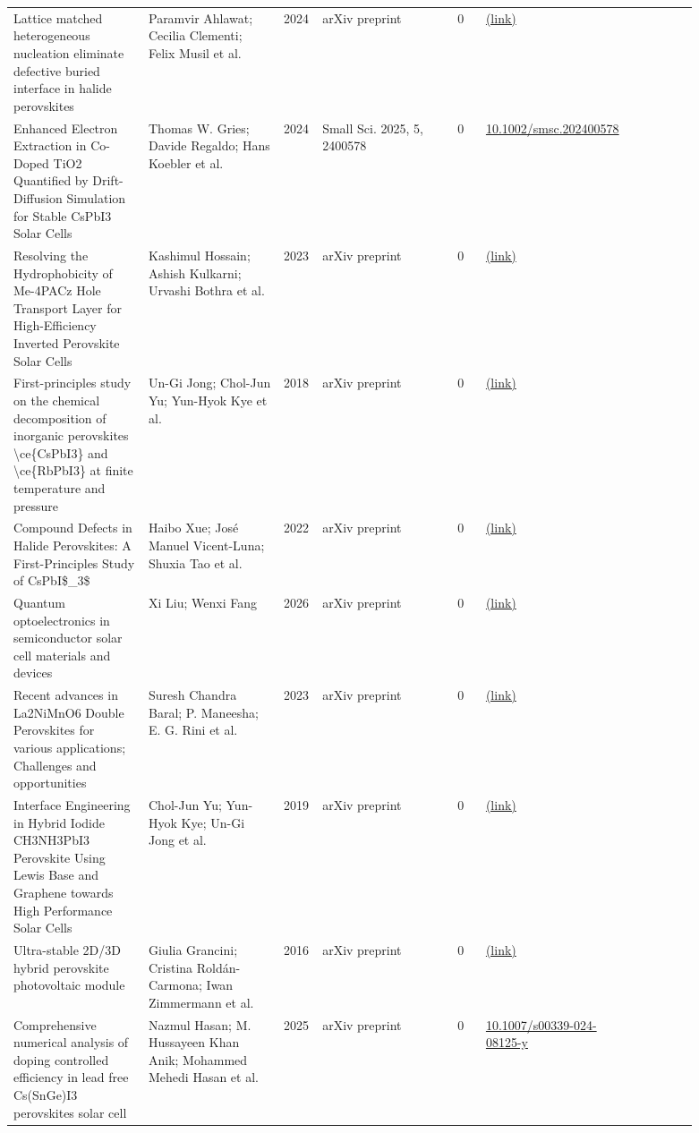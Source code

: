 \documentclass[10pt,a4paper]{article}
\begin{document}
{\begin{longtable}{p{0.197\linewidth}p{0.197\linewidth}p{0.043\linewidth}p{0.197\linewidth}p{0.043\linewidth}p{0.117\linewidth}p{0.098\linewidth}}
Lattice matched heterogeneous nucleation eliminate defective buried interface in halide perovskites & Paramvir Ahlawat; Cecilia Clementi; Felix Musil et al. & 2024 & arXiv preprint & 0 & \href{http://arxiv.org/abs/2405.11599v1}{(link)} &  \\
Enhanced Electron Extraction in Co-Doped TiO2 Quantified by Drift-Diffusion Simulation for Stable CsPbI3 Solar Cells & Thomas W. Gries; Davide Regaldo; Hans Koebler et al. & 2024 & Small Sci. 2025, 5, 2400578 & 0 & \href{https://doi.org/10.1002/smsc.202400578}{10.1002/smsc.202400578} &  \\
Resolving the Hydrophobicity of Me-4PACz Hole Transport Layer for High-Efficiency Inverted Perovskite Solar Cells & Kashimul Hossain; Ashish Kulkarni; Urvashi Bothra et al. & 2023 & arXiv preprint & 0 & \href{http://arxiv.org/abs/2304.13788v1}{(link)} &  \\
First-principles study on the chemical decomposition of inorganic perovskites \textbackslash{}ce\{CsPbI3\} and \textbackslash{}ce\{RbPbI3\} at finite temperature and pressure & Un-Gi Jong; Chol-Jun Yu; Yun-Hyok Kye et al. & 2018 & arXiv preprint & 0 & \href{http://arxiv.org/abs/1807.02277v1}{(link)} &  \\
Compound Defects in Halide Perovskites: A First-Principles Study of CsPbI\$\_3\$ & Haibo Xue; José Manuel Vicent-Luna; Shuxia Tao et al. & 2022 & arXiv preprint & 0 & \href{http://arxiv.org/abs/2209.03484v1}{(link)} &  \\
Quantum optoelectronics in semiconductor solar cell materials and devices & Xi Liu; Wenxi Fang & 2026 & arXiv preprint & 0 & \href{http://arxiv.org/abs/2608.04328v2}{(link)} &  \\
Recent advances in La2NiMnO6 Double Perovskites for various applications; Challenges and opportunities & Suresh Chandra Baral; P. Maneesha; E. G. Rini et al. & 2023 & arXiv preprint & 0 & \href{http://arxiv.org/abs/2304.06951v1}{(link)} &  \\
Interface Engineering in Hybrid Iodide CH3NH3PbI3 Perovskite Using Lewis Base and Graphene towards High Performance Solar Cells & Chol-Jun Yu; Yun-Hyok Kye; Un-Gi Jong et al. & 2019 & arXiv preprint & 0 & \href{http://arxiv.org/abs/1908.05237v2}{(link)} &  \\
Ultra-stable 2D/3D hybrid perovskite photovoltaic module & Giulia Grancini; Cristina Roldán-Carmona; Iwan Zimmermann et al. & 2016 & arXiv preprint & 0 & \href{http://arxiv.org/abs/1609.09846v1}{(link)} &  \\
Comprehensive numerical analysis of doping controlled efficiency in lead free Cs(SnGe)I3 perovskites solar cell & Nazmul Hasan; M. Hussayeen Khan Anik; Mohammed Mehedi Hasan et al. & 2025 & arXiv preprint & 0 & \href{https://doi.org/10.1007/s00339-024-08125-y}{10.1007/s00339-024-08125-y} &  \\

\end{longtable}}
\end{document}
